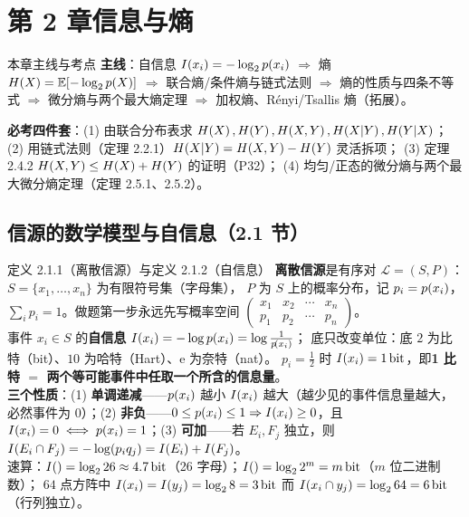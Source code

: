 
\section{第 2 章\quad 信息与熵}

\begin{keypoint}{本章主线与考点}
\textbf{主线}：自信息 $I\!\left(x_i\right)=-\log_{2}p\!\left(x_i\right)$ $\Rightarrow$ 熵 $H\!\left(X\right)=\operatorname{\mathbb{E}}[-\log_{2}p\!\left(X\right)]$
$\Rightarrow$ 联合熵/条件熵与链式法则 $\Rightarrow$ 熵的性质与四条不等式
$\Rightarrow$ 微分熵与两个最大熵定理 $\Rightarrow$ 加权熵、Rényi/Tsallis 熵（拓展）。

\textbf{必考四件套}：(1) 由联合分布表求 $H\!\left(X\right),H\!\left(Y\right),H\!\left(X,Y\right),H\!\left(X|Y\right),H\!\left(Y|X\right)$；
(2) 用链式法则（定理 2.2.1）$H\!\left(X|Y\right)=H\!\left(X,Y\right)-H\!\left(Y\right)$ 灵活拆项；
(3) 定理 2.4.2 $H\!\left(X,Y\right)\le H\!\left(X\right)+H\!\left(Y\right)$ 的证明（P32）；
(4) 均匀/正态的微分熵与两个最大微分熵定理（定理 2.5.1、2.5.2）。
\end{keypoint}

\subsection{信源的数学模型与自信息（2.1 节）}

\begin{defbox}{定义 2.1.1（离散信源）与定义 2.1.2（自信息）}
\textbf{离散信源}是有序对 $\mathcal{L}=(S,P)$：$S=\{x_1,\dots,x_n\}$ 为有限符号集（字母集），
$P$ 为 $S$ 上的概率分布，记 $p_i=p\!\left(x_i\right)$，$\sum_i p_i=1$。做题第一步永远先写概率空间
$\begin{pmatrix}x_1 & x_2 & \cdots & x_n\\ p_1 & p_2 & \cdots & p_n\end{pmatrix}$。\\[2pt]
事件 $x_i\in S$ 的\textbf{自信息}
$I\!\left(x_i\right)=-\log p\!\left(x_i\right)=\log\frac{1}{p\!\left(x_i\right)}$；
底只改变单位：底 $2$ 为比特（bit）、$10$ 为哈特（Hart）、e 为奈特（nat）。
$p_i=\tfrac12$ 时 $I\!\left(x_i\right)=1\,\text{bit}$，即\textbf{1 比特 $=$ 两个等可能事件中任取一个所含的信息量}。\\[2pt]
\textbf{三个性质}：(1) \textbf{单调递减}——$p\!\left(x_i\right)$ 越小 $I\!\left(x_i\right)$ 越大（越少见的事件信息量越大，
必然事件为 $0$）；(2) \textbf{非负}——$0\le p\!\left(x_i\right)\le1\Rightarrow I\!\left(x_i\right)\ge0$，且
$I\!\left(x_i\right)=0\iff p\!\left(x_i\right)=1$；(3) \textbf{可加}——若 $E_i,F_j$ 独立，则
$I\!\left(E_i\cap F_j\right)=-\log(p_iq_j)=I\!\left(E_i\right)+I\!\left(F_j\right)$。\\
速算：$I\!\left(\right)=\log_{2}26\approx4.7\,\text{bit}$（26 字母）；$I\!\left(\right)=\log_{2}2^m=m\,\text{bit}$（$m$ 位二进制数）；
$64$ 点方阵中 $I\!\left(x_i\right)=I\!\left(y_j\right)=\log_{2}8=3\,\text{bit}$ 而 $I\!\left(x_i\cap y_j\right)=\log_{2}64=6\,\text{bit}$（行列独立）。
\end{defbox}

